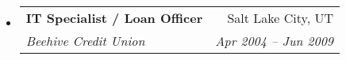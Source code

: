 \documentclass[letterpaper,11pt]{article}
\makeatletter
\newcommand{\resitem}[1]{\item #1 \vspace{-2pt}}
\newcommand{\ressubheading}[4]{
\begin{tabular*}{6.5in}{l@{\extracolsep{\fill}}r}
		\textbf{#1} & #2 \\
		\textit{#3} & \textit{#4} \\
\end{tabular*}\vspace{-6pt}}
\makeatother
\begin{document}
\begin{itemize}
\begin{comment}
				{ \footnotesize
				\begin{itemize}
					\resitem{Responsible for setup, deployment, and ongoing maintenance of 80+ desktop systems running Windows and Ubuntu Linux}
					\resitem{Prepared systems for global user conference, administration and deployment of secured Samba file server, research and purchasing decision for new VoIP equipment}
				\end{itemize}
				}
\end{comment}
		\item
			\ressubheading{IT Specialist / Loan Officer}{Salt Lake City, UT}{Beehive Credit Union}{Apr 2004 -- Jun 2009}
\begin{comment}
				{ \footnotesize
				\begin{itemize}
					\resitem{Advised Board of Directors on selecting and deploying \$100k VoIP telephone system}
					\resitem{Team lead for project implementing VPN failover connections at 9 branches for disaster recovery purposes}
					\resitem{Developed and wrote ATM security procedures manual for the entire credit union}
					\resitem{Performed fraud prevention and detection as first backup to the BSA (Bank Secrecy Act) Officer}
				\end{itemize}
	          		}
\end{comment}
\begin{comment}
		\item
			\ressubheading{Owner/Photographer}{Salt Lake City, UT}{Matchless Images}{2004 -- 2012}
			{ \footnotesize
			\begin{itemize}
				\resitem{Handle photography and video services for a national nursing organization, including coverage of annual national conferences}
				\resitem{Provide volunteer photography service for non-profit, charity focused roller derby league in Salt Lake City}
			\end{itemize}
			}
\end{comment}
	\end{itemize}  %
\end{document}
